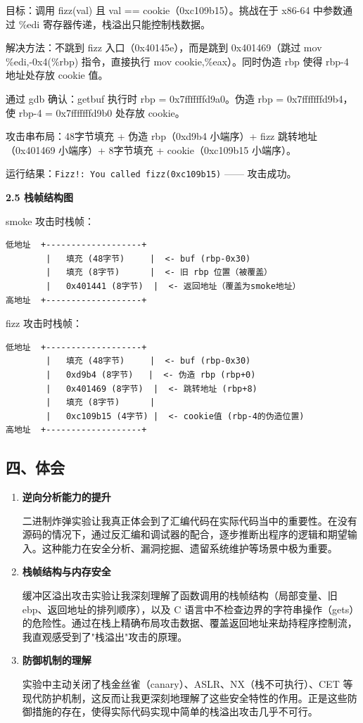 目标：调用 fizz(val) 且 val == cookie（0xc109b15）。挑战在于 x86-64 中参数通过 \%edi 寄存器传递，栈溢出只能控制栈数据。

解决方法：不跳到 fizz 入口（0x40145e），而是跳到 0x401469（跳过 mov \%edi,-0x4(\%rbp) 指令，直接执行 mov cookie,\%eax）。同时伪造 rbp 使得 rbp-4 地址处存放 cookie 值。

通过 gdb 确认：getbuf 执行时 rbp = 0x7fffffffd9a0。伪造 rbp = 0x7fffffffd9b4，使 rbp-4 = 0x7fffffffd9b0 处存放 cookie。

攻击串布局：48字节填充 + 伪造 rbp（0xd9b4 小端序）+ fizz 跳转地址（0x401469 小端序）+ 8字节填充 + cookie（0xc109b15 小端序）。

运行结果：\texttt{Fizz!: You called fizz(0xc109b15)} —— 攻击成功。

\textbf{2.5 栈帧结构图}

smoke 攻击时栈帧：
\begin{lstlisting}
低地址  +-------------------+
        |   填充 (48字节)     |  <- buf (rbp-0x30)
        |   填充 (8字节)      |  <- 旧 rbp 位置（被覆盖）
        |   0x401441 (8字节)  |  <- 返回地址（覆盖为smoke地址）
高地址  +-------------------+
\end{lstlisting}

fizz 攻击时栈帧：
\begin{lstlisting}
低地址  +-------------------+
        |   填充 (48字节)     |  <- buf (rbp-0x30)
        |   0xd9b4 (8字节)   |  <- 伪造 rbp (rbp+0)
        |   0x401469 (8字节)  |  <- 跳转地址 (rbp+8)
        |   填充 (8字节)      |
        |   0xc109b15 (4字节) |  <- cookie值 (rbp-4的伪造位置)
高地址  +-------------------+
\end{lstlisting}

\subsection*{四、体会}

\begin{enumerate}[label=\arabic*.]
    \item \textbf{逆向分析能力的提升}

    二进制炸弹实验让我真正体会到了汇编代码在实际代码当中的重要性。在没有源码的情况下，通过反汇编和调试器的配合，逐步推断出程序的逻辑和期望输入。这种能力在安全分析、漏洞挖掘、遗留系统维护等场景中极为重要。

    \item \textbf{栈帧结构与内存安全}

    缓冲区溢出攻击实验让我深刻理解了函数调用的栈帧结构（局部变量、旧ebp、返回地址的排列顺序），以及 C 语言中不检查边界的字符串操作（gets）的危险性。通过在栈上精确布局攻击数据、覆盖返回地址来劫持程序控制流，我直观感受到了"栈溢出"攻击的原理。

    \item \textbf{防御机制的理解}

    实验中主动关闭了栈金丝雀（canary）、ASLR、NX（栈不可执行）、CET 等现代防护机制，这反而让我更深刻地理解了这些安全特性的作用。正是这些防御措施的存在，使得实际代码实现中简单的栈溢出攻击几乎不可行。

\end{enumerate}

\newpage